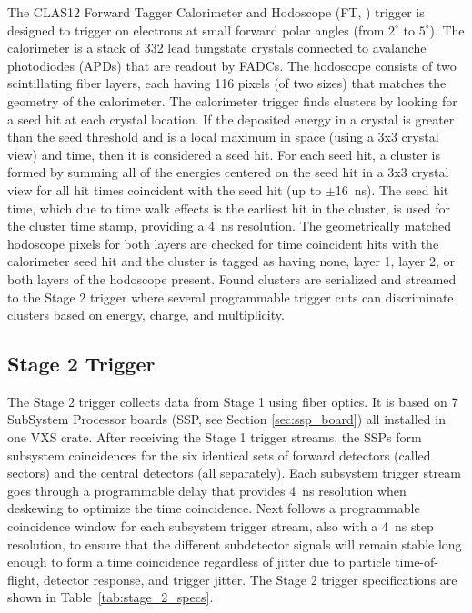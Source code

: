 The CLAS12 Forward Tagger Calorimeter and Hodoscope (FT, \cite{ft-ref}) trigger is designed to trigger on electrons at small forward polar angles (from $2^\circ$  to $5^\circ$). The calorimeter is a stack of 332 lead tungstate crystals connected to avalanche photodiodes (APDs) that are readout by FADCs. The hodoscope consists of two scintillating fiber layers, each having 116 pixels (of two sizes) that matches the geometry of the calorimeter. The calorimeter trigger finds clusters by looking for a seed hit at each crystal location. If the deposited energy in a crystal is greater than the seed threshold and is a local maximum in space (using a 3x3 crystal view) and time, then it is considered a seed hit. For each seed hit, a cluster is formed by summing all of the energies centered on the seed hit in a 3x3 crystal view for all hit times coincident with the seed hit (up to $\pm$16~ns). The seed hit time, which due to time walk effects is the earliest hit in the cluster, is used for the cluster time stamp, providing a 4~ns resolution. The geometrically matched hodoscope pixels for both layers are checked for time coincident hits with the calorimeter seed hit and the cluster is tagged as having none, layer 1, layer 2, or both layers of the hodoscope present. Found clusters are serialized and streamed to the Stage 2 trigger where several programmable trigger cuts can discriminate clusters based on energy, charge, and multiplicity.


\subsection{Stage 2 Trigger}

The Stage 2 trigger collects data from Stage 1 using fiber optics. It is based on 7 SubSystem Processor boards (SSP, see Section \ref*{sec:ssp_board}) all installed in one VXS crate. After receiving the Stage 1 trigger streams, the SSPs form subsystem coincidences for the six identical sets of forward detectors (called sectors) and the central detectors (all separately). Each subsystem trigger stream goes through a programmable delay that provides 4~ns resolution when deskewing to optimize the time coincidence. Next follows a programmable coincidence window for each subsystem trigger stream, also with a 4~ns step resolution, to ensure that the different subdetector signals will remain stable long enough to form a time coincidence regardless of jitter due to particle time-of-flight, detector response, and trigger jitter. The Stage 2 trigger specifications are shown in Table~\ref{tab:stage_2_specs}.

